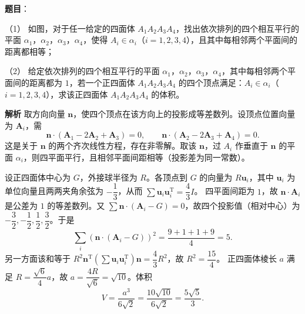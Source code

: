 \begin{answer}

\textbf{题目}：

（1） 如图，对于任一给定的四面体 $A_1A_2A_3A_4$，找出依次排列的四个相互平行的平面 $\alpha_1$，$\alpha_2$，$\alpha_3$，$\alpha_4$，使得 $A_i\in\alpha_i$（$i=1,2,3,4$），且其中每相邻两个平面间的距离都相等；

（2） 给定依次排列的四个相互平行的平面 $\alpha_1$，$\alpha_2$，$\alpha_3$，$\alpha_4$，其中每相邻两个平面间的距离都为 $1$，若一个正四面体 $A_1A_2A_3A_4$ 的四个顶点满足：$A_i\in\alpha_i$（$i=1,2,3,4$），求该正四面体 $A_1A_2A_3A_4$ 的体积。
\nopagebreak[4]
\begin{center}\end{center}
\nopagebreak[4]
\textbf{解析}
取方向向量 $\boldsymbol n$，使四个顶点在该方向上的投影成等差数列。设顶点位置向量为 $\boldsymbol A_i$，需
\nopagebreak[4]
\[\boldsymbol n\cdot(\boldsymbol A_1-2\boldsymbol A_2+\boldsymbol A_3)=0,\qquad \boldsymbol n\cdot(\boldsymbol A_2-2\boldsymbol A_3+\boldsymbol A_4)=0.\]
这是关于 $\boldsymbol n$ 的两个齐次线性方程，存在非零解。取该 $\boldsymbol n$，过 $A_i$ 作垂直于 $\boldsymbol n$ 的平面 $\alpha_i$，则四平面平行，且相邻平面间距相等（投影差为同一常数）。

设正四面体中心为 $G$，外接球半径为 $R$。各顶点到 $G$ 的向量为 $R\boldsymbol u_i$，其中 $\boldsymbol u_i$ 为单位向量且两两夹角余弦为 $-\dfrac13$，从而 $\sum\boldsymbol u_i\boldsymbol u_i^{\mathrm T}=\dfrac43I$。
四平面间距为 $1$，故 $\boldsymbol n\cdot\boldsymbol A_i$ 是公差为 $1$ 的等差数列。又 $\sum\boldsymbol n\cdot(\boldsymbol A_i-G)=0$，故四个投影值（相对中心）为 $-\dfrac32,-\dfrac12,\dfrac12,\dfrac32$。于是
\nopagebreak[4]
\[\sum_i(\boldsymbol n\cdot(\boldsymbol A_i-G))^2=\frac{9+1+1+9}{4}=5.\]
另一方面该和等于 $R^2\boldsymbol n^{\mathrm T}\left(\sum\boldsymbol u_i\boldsymbol u_i^{\mathrm T}\right)\boldsymbol n=\dfrac43R^2$，故 $R^2=\dfrac{15}4$。
正四面体棱长 $a$ 满足 $R=\dfrac{\sqrt6}4a$，故 $a=\dfrac{4R}{\sqrt6}=\sqrt{10}$。体积
\nopagebreak[4]
\[V=\frac{a^3}{6\sqrt2}=\frac{10\sqrt{10}}{6\sqrt2}=\frac{5\sqrt5}3.\]



\end{answer}